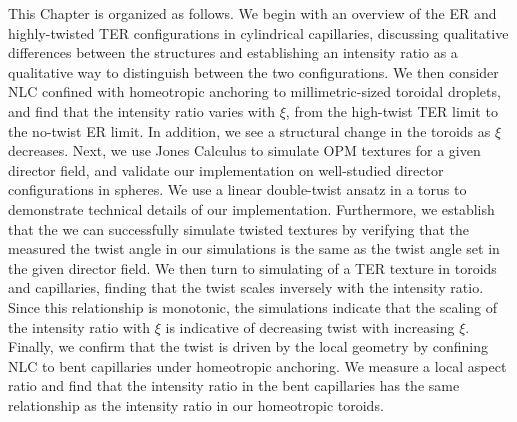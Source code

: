 This Chapter is organized as follows.
We begin with an overview of the ER and highly-twisted TER configurations in cylindrical capillaries, discussing qualitative differences between the structures and establishing an intensity ratio as a qualitative way to distinguish between the  two configurations.
We then consider NLC confined with homeotropic anchoring to millimetric-sized toroidal droplets, and find that the intensity ratio varies with $\xi$, from the high-twist TER limit to the no-twist ER limit.
In addition, we see a structural change in the toroids as $\xi$ decreases.
Next, we use Jones Calculus to simulate OPM textures for a given director field, and validate our implementation on well-studied director configurations in spheres.
We use a linear double-twist ansatz in a torus to demonstrate technical details of our implementation.
Furthermore, we establish that the we can successfully simulate twisted textures by verifying that the measured the twist angle in our simulations is the same as the twist angle set in the given director field.
We then turn to simulating of a TER texture in toroids and capillaries, finding that the twist scales inversely with the intensity ratio.
Since this relationship is monotonic, the simulations indicate that the scaling of the intensity ratio with $\xi$ is indicative of decreasing twist with increasing $\xi$.
Finally, we confirm that the twist is driven by the local geometry by confining NLC to bent capillaries under homeotropic anchoring.
We measure a local aspect ratio and find that the intensity ratio in the bent capillaries has the same relationship as the intensity ratio in our homeotropic toroids.




